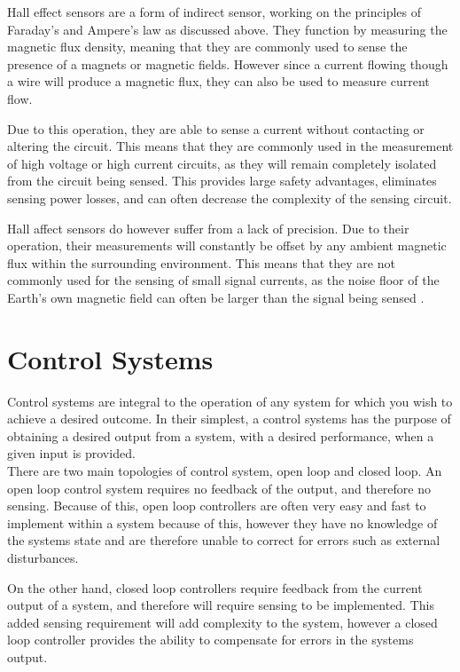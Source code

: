Hall effect sensors are a form of indirect sensor, working on the principles of Faraday’s and Ampere’s law as discussed above. They function by measuring the magnetic flux density, meaning that they are commonly used to sense the presence of a magnets or magnetic fields. However since a current flowing though a wire will produce a magnetic flux, they can also be used to measure current flow.

Due to this operation, they are able to sense a current without contacting or altering the circuit. This means that they are commonly used in the measurement of high voltage or high current circuits, as they will remain completely isolated from the circuit being sensed. This provides large safety advantages, eliminates sensing power losses, and can often decrease the complexity of the sensing circuit. 

Hall affect sensors do however suffer from a lack of precision. Due to their operation, their measurements will constantly be offset by any ambient magnetic flux within the surrounding environment. This means that they are not commonly used for the sensing of small signal currents, as the noise floor of the Earth's own magnetic field can often be larger than the signal being sensed \cite{hall_effect_precision}. 

\newpage

\section{Control Systems}\label{S:control_back}

Control systems are integral to the operation of any system for which you wish to achieve a desired outcome. In their simplest, a control systems has the purpose of obtaining a desired output from a system, with a desired performance, when a given input is provided. \\

There are two main topologies of control system, open loop and closed loop. An open loop control system requires no feedback of the output, and therefore no sensing. Because of this, open loop controllers are often very easy and fast to implement within a system because of this, however they have no knowledge of the systems state and are therefore unable to correct for errors such as external disturbances. 

On the other hand, closed loop controllers require feedback from the current output of a system, and therefore will require sensing to be implemented. This added sensing requirement will add complexity to the system, however a closed loop controller provides the ability to compensate for errors in the systems output.\\

